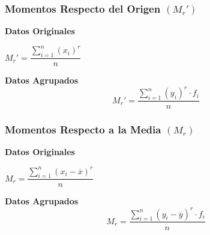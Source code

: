 \subsubsection{Momentos Respecto del Origen $(M_r')$}
\begin{multicols}{2}
\textbf{Datos Originales} 
\begin{center}
$M_{r}'=\dfrac{\displaystyle\sum_{i=1}^{n}(x_i)^r}{n}$
\end{center}
\columnbreak
\textbf{Datos Agrupados}
$$M_{r}'=\dfrac{\displaystyle\sum_{i=1}^{n}(y_i)^r\cdot f_i}{n}$$
\end{multicols}
\subsubsection{Momentos Respecto a la Media $(M_r)$}
\begin{multicols}{2}
\textbf{Datos Originales} 
\begin{center}
$M_{r}=\dfrac{\displaystyle\sum_{i=1}^{n}(x_i-\overline{x})^r}{n}$
\end{center}
\columnbreak
\textbf{Datos Agrupados}
$$M_{r}=\dfrac{\displaystyle\sum_{i=1}^{n}(y_i-\overline{y})^r\cdot f_i}{n}$$
\end{multicols}
